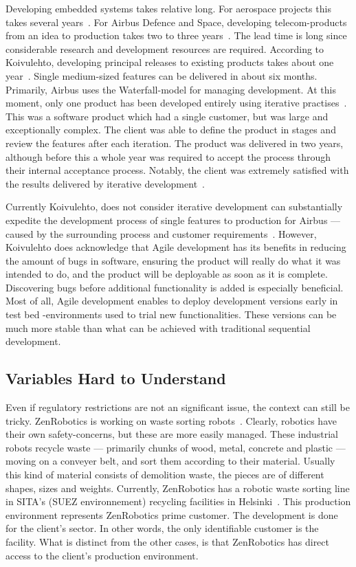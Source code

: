 \documentclass[english]{tktltiki2}
\begin{document}
Developing embedded systems takes relative long. For aerospace projects this takes several years~\cite{Hol15b}. For Airbus Defence and Space, developing telecom-products from an idea to production takes two to three years~\cite{Koi15}. The lead time is long since considerable research and development resources are required. According to Koivulehto, developing principal releases to existing products takes about one year~\cite{Koi15}. Single medium-sized features can be delivered in about six months. Primarily, Airbus uses the Waterfall-model for managing development. At this moment, only one product has been developed entirely using iterative practises~\cite{Koi15}. This was a software product which had a single customer, but was large and exceptionally complex. The client was able to define the product in stages and review the features after each iteration. The product was delivered in two years, although before this a whole year was required to accept the process through their internal acceptance process. Notably, the client was extremely satisfied with the results delivered by iterative development~\cite{Koi15}.

Currently Koivulehto, does not consider iterative development can substantially expedite the development process of single features to production for Airbus — caused by the surrounding process and customer requirements~\cite{Koi15}. However, Koivulehto does acknowledge that Agile development has its benefits in reducing the amount of bugs in software, ensuring the product will really do what it was intended to do, and the product will be deployable as soon as it is complete. Discovering bugs before additional functionality is added is especially beneficial. Most of all, Agile development enables to deploy development versions early in test bed -environments used to trial new functionalities. These versions can be much more stable than what can be achieved with traditional sequential development.

\subsection{Variables Hard to Understand}

Even if regulatory restrictions are not an significant issue, the context can still be tricky. ZenRobotics is working on waste sorting robots~\cite{Hol15a}. Clearly, robotics have their own safety-concerns, but these are more easily managed. These industrial robots recycle waste — primarily chunks of wood, metal, concrete and plastic — moving on a conveyer belt, and sort them according to their material. Usually this kind of material consists of demolition waste, the pieces are of different shapes, sizes and weights. Currently, ZenRobotics has a robotic waste sorting line in SITA’s (SUEZ environnement) recycling facilities in Helsinki~\cite{Hol15a, SITA}. This production environment represents ZenRobotics prime customer. The development is done for the client’s sector. In other words, the only identifiable customer is the facility. What is distinct from the other cases, is that ZenRobotics has direct access to the client’s production environment.
\end{document}
